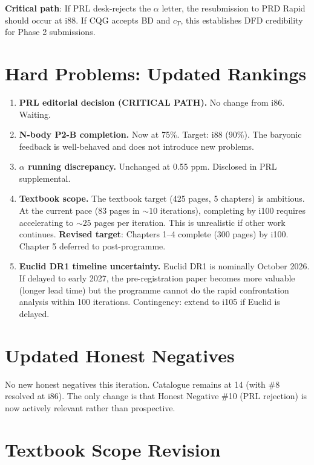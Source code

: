 \documentclass[11pt,a4paper]{article}
\begin{document}
\textbf{Critical path}: If PRL desk-rejects the $\alpha$ letter, the resubmission to PRD Rapid should occur at i88. If CQG accepts BD and $c_T$, this establishes DFD credibility for Phase 2 submissions.

\section{Hard Problems: Updated Rankings}

\begin{enumerate}
\item \textbf{PRL editorial decision (CRITICAL PATH).} No change from i86. Waiting.

\item \textbf{N-body P2-B completion.} Now at 75\%. Target: i88 (90\%). The baryonic feedback is well-behaved and does not introduce new problems.

\item \textbf{$\alpha$ running discrepancy.} Unchanged at 0.55 ppm. Disclosed in PRL supplemental.

\item \textbf{Textbook scope.} The textbook target (425 pages, 5 chapters) is ambitious. At the current pace (83 pages in $\sim 10$ iterations), completing by i100 requires accelerating to $\sim 25$ pages per iteration. This is unrealistic if other work continues. \textbf{Revised target}: Chapters 1--4 complete (300 pages) by i100. Chapter 5 deferred to post-programme.

\item \textbf{Euclid DR1 timeline uncertainty.} Euclid DR1 is nominally October 2026. If delayed to early 2027, the pre-registration paper becomes more valuable (longer lead time) but the programme cannot do the rapid confrontation analysis within 100 iterations. Contingency: extend to i105 if Euclid is delayed.
\end{enumerate}

\section{Updated Honest Negatives}

No new honest negatives this iteration. Catalogue remains at 14 (with \#8 resolved at i86). The only change is that Honest Negative \#10 (PRL rejection) is now actively relevant rather than prospective.

\section{Textbook Scope Revision}
\end{document}

